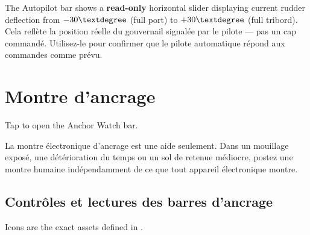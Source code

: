 The Autopilot bar shows a \textbf{read-only} horizontal slider displaying current
rudder deflection from $-30\textdegree$ (full port) to $+30\textdegree$ (full
tribord).
Cela reflète la position réelle du gouvernail signalée par le pilote ---
pas un cap commandé.
Utilisez-le pour confirmer que le pilote automatique répond aux commandes comme prévu.

\chapter{Montre d'ancrage}
\label{ch:anchor}

Tap  to open the Anchor Watch bar.

\begin{warningbox}
La montre électronique d'ancrage est une aide seulement.
Dans un mouillage exposé, une détérioration du temps ou un sol de retenue médiocre,
postez une montre humaine indépendamment de ce que tout appareil électronique montre.
\end{warningbox}


\section{Contrôles et lectures des barres d'ancrage}

Icons are the exact assets defined in .

